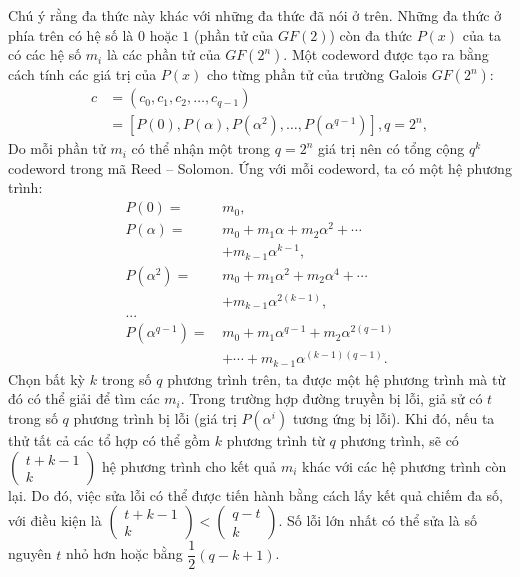 \begin{multicols}{2}
	Chú ý rằng đa thức này khác với những đa thức đã nói ở trên. Những đa thức ở phía trên có hệ số là $0$ hoặc $1$ (phần tử của $GF(2)$) còn đa thức $P(x)$ của ta có các hệ số $m_i$ là các phần tử của $GF(2^n)$. Một codeword được tạo ra bằng cách tính các giá trị của $P(x)$ cho từng phần tử của trường Galois $GF(2^n)$:
	\begin{align*}
	c &\!=\! \left(c_0,c_1,c_2,\ldots,c_{q-1}\right) \\
	&\!=\!\! \left[\!P(0), P(\!\alpha\!), P(\alpha^2), \ldots, P(\alpha^{q-1}\!)\!\right]\!,q \!=\! 2^n,
	\end{align*}
	Do mỗi phần tử $m_i$ có thể nhận một trong $q=2^n$ giá trị nên có tổng cộng $q^k$ codeword trong mã Reed -- Solomon. Ứng với mỗi codeword, ta có một hệ phương trình:
	\begin{align*}
		P(0)=\,&m_0, \\
		P(\alpha)=\,&m_0+m_1 \alpha+m_2 \alpha^2+\cdots\\
		&+m_{k-1} \alpha^{k-1},\\
		P(\alpha^2 )=\,&m_0+m_1 \alpha^2+m_2 \alpha^4+\cdots\\
		&+m_{k-1} \alpha^{2(k-1)},\\ 
		...&\\
		P(\alpha^{q-1})=\,&m_0+m_1 \alpha^{q-1}+m_2 \alpha^{2(q-1)} \\
		&+\cdots+m_{k-1} \alpha^{(k-1)(q-1)}. 
	\end{align*}
	Chọn bất kỳ $k$ trong số $q$ phương trình trên, ta được một hệ phương trình mà từ đó có thể giải để tìm các $m_i$.
	\vskip 0.1cm
	Trong trường hợp đường truyền bị lỗi, giả sử có $t$ trong số $q$ phương trình bị lỗi (giá trị $P\left(\alpha^i\right)$ tương ứng bị lỗi). Khi đó, nếu ta thử tất cả các tổ hợp có thể gồm $k$ phương trình từ $q$ phương trình, sẽ có $\left( \begin{array}{l}
		t + k - 1\\
		k
	\end{array} \right)$ hệ phương trình cho kết quả $m_i$ khác với các hệ phương trình còn lại. Do đó, việc sửa lỗi có thể được tiến hành bằng cách lấy kết quả chiếm đa số, với điều kiện là  $\left( \begin{array}{l}
	t + k - 1\\
	k
\end{array} \right) < \left( \begin{array}{l}
q - t\\
k
\end{array} \right)$. Số lỗi lớn nhất có thể sửa là số nguyên $t$ nhỏ hơn hoặc bằng $\dfrac{1}{2}(q-k+1)$.

\end{multicols}
